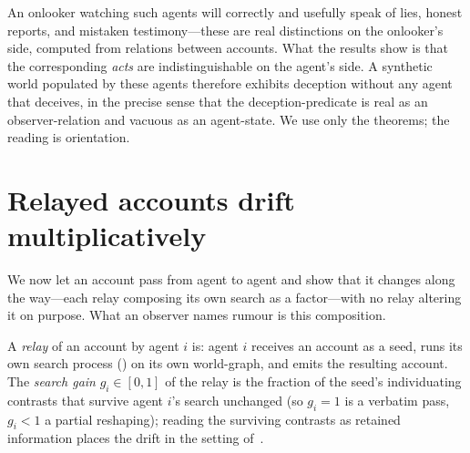 \documentclass[11pt,twocolumn,a4paper]{article}
\begin{document}
\begin{remark}
\label{rem:deception}
An onlooker watching such agents will correctly and usefully speak of lies,
honest reports, and mistaken testimony---these are real distinctions on the
onlooker's side, computed from relations between accounts. What the results
show is that the corresponding \emph{acts} are indistinguishable on the
agent's side. A synthetic world populated by these agents therefore exhibits
deception without any agent that deceives, in the precise sense that the
deception-predicate is real as an observer-relation and vacuous as an
agent-state. We use only the theorems; the reading is orientation.
\end{remark}

\section{Relayed accounts drift multiplicatively}
\label{sec:drift}

We now let an account pass from agent to agent and show that it changes
along the way---each relay composing its own search as a factor---with no
relay altering it on purpose. What an observer names rumour is this
composition.

\begin{definition}
\label{def:relay}
A \emph{relay} of an account by agent $i$ is: agent $i$ receives an account
as a seed, runs its own search process () on its own
world-graph, and emits the resulting account. The \emph{search gain}
$g_i\in[0,1]$ of the relay is the fraction of the seed's individuating
contrasts that survive agent $i$'s search unchanged (so $g_i=1$ is a
verbatim pass, $g_i<1$ a partial reshaping); reading the surviving
contrasts as retained information places the drift in the setting
of~\cite{shannon1948,coverthomas2006}.
\end{definition}
\end{document}
